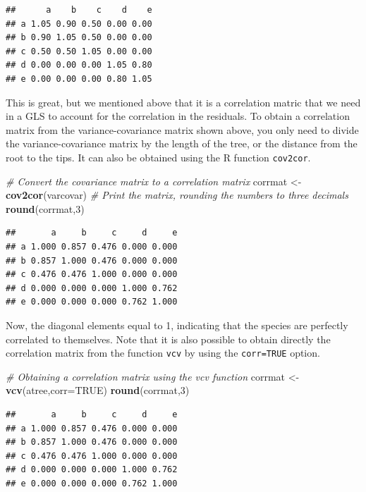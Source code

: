 \documentclass[
]{book}
\newenvironment{Shaded}{\begin{snugshade}}{\end{snugshade}}
\newcommand{\AttributeTok}[1]{\textcolor[rgb]{0.13,0.29,0.53}{#1}}
\newcommand{\CommentTok}[1]{\textcolor[rgb]{0.56,0.35,0.01}{\textit{#1}}}
\newcommand{\ConstantTok}[1]{\textcolor[rgb]{0.56,0.35,0.01}{#1}}
\newcommand{\DecValTok}[1]{\textcolor[rgb]{0.00,0.00,0.81}{#1}}
\newcommand{\FunctionTok}[1]{\textcolor[rgb]{0.13,0.29,0.53}{\textbf{#1}}}
\newcommand{\NormalTok}[1]{#1}
\newcommand{\OtherTok}[1]{\textcolor[rgb]{0.56,0.35,0.01}{#1}}
\begin{document}
\begin{verbatim}
##      a    b    c    d    e
## a 1.05 0.90 0.50 0.00 0.00
## b 0.90 1.05 0.50 0.00 0.00
## c 0.50 0.50 1.05 0.00 0.00
## d 0.00 0.00 0.00 1.05 0.80
## e 0.00 0.00 0.00 0.80 1.05
\end{verbatim}

This is great, but we mentioned above that it is a correlation matric that we need in a GLS to account for the correlation in the residuals. To obtain a correlation matrix from the variance-covariance matrix shown above, you only need to divide the variance-covariance matrix by the length of the tree, or the distance from the root to the tips. It can also be obtained using the R function \texttt{cov2cor}.

\begin{Shaded}
\begin{Highlighting}[]
\CommentTok{\# Convert the covariance matrix to a correlation matrix}
\NormalTok{corrmat }\OtherTok{\textless{}{-}} \FunctionTok{cov2cor}\NormalTok{(varcovar)}
\CommentTok{\# Print the matrix, rounding the numbers to three decimals}
\FunctionTok{round}\NormalTok{(corrmat,}\DecValTok{3}\NormalTok{)}
\end{Highlighting}
\end{Shaded}

\begin{verbatim}
##       a     b     c     d     e
## a 1.000 0.857 0.476 0.000 0.000
## b 0.857 1.000 0.476 0.000 0.000
## c 0.476 0.476 1.000 0.000 0.000
## d 0.000 0.000 0.000 1.000 0.762
## e 0.000 0.000 0.000 0.762 1.000
\end{verbatim}

Now, the diagonal elements equal to 1, indicating that the species are perfectly correlated to themselves. Note that it is also possible to obtain directly the correlation matrix from the function \texttt{vcv} by using the \texttt{corr=TRUE} option.

\begin{Shaded}
\begin{Highlighting}[]
\CommentTok{\# Obtaining a correlation matrix using the \textquotesingle{}vcv\textquotesingle{} function}
\NormalTok{corrmat }\OtherTok{\textless{}{-}} \FunctionTok{vcv}\NormalTok{(atree,}\AttributeTok{corr=}\ConstantTok{TRUE}\NormalTok{)}
\FunctionTok{round}\NormalTok{(corrmat,}\DecValTok{3}\NormalTok{)}
\end{Highlighting}
\end{Shaded}

\begin{verbatim}
##       a     b     c     d     e
## a 1.000 0.857 0.476 0.000 0.000
## b 0.857 1.000 0.476 0.000 0.000
## c 0.476 0.476 1.000 0.000 0.000
## d 0.000 0.000 0.000 1.000 0.762
## e 0.000 0.000 0.000 0.762 1.000
\end{verbatim}
\end{document}

